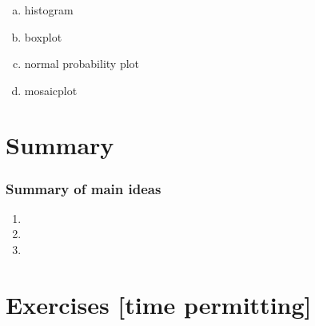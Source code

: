 \documentclass[11pt,containsverbatim,handout,xcolor=xelatex,dvipsnames,table]{beamer}
\newcommand{\solnMult}[1]{#1}
\begin{document}

\begin{frame}
\frametitle{}


\begin{enumerate}[(a)]
\item histogram
\item boxplot
\item normal probability plot
\item \solnMult{mosaicplot}
\end{enumerate}

\end{frame}


\section{Summary}


\begin{frame}
\frametitle{Summary of main ideas}

\vfill

\begin{enumerate}

\item {}

\item {}

\item {}

\end{enumerate}

\vfill

\end{frame}


\section{Exercises [time permitting]}

\end{document}
